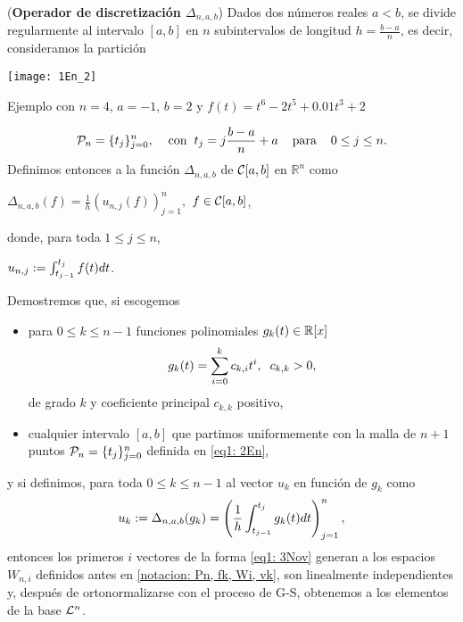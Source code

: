 \begin{defi}
(\textbf{Operador de discretización $\Delta_{n,a,b}$})
Dados dos números reales $a<b$, se divide
regularmente al intervalo $[a,b]$ en 
$n$ subintervalos de longitud $h=\frac{b-a}{n}$,
es decir, consideramos la partición


\begin{marginfigure}
\texttt{[image: 1En\_2]} 
		\caption{Ejemplo con $n=4$, $a=-1$, $b=2$ y
		$f(t)= t^{6}-2t^{5}+0.01t^{3}+2$}
\end{marginfigure}


\begin{equation}
\label{eq1: 2En}
\mathcal{P}_{n}= \{ t_{j} \}_{j=0}^{n}, 
\hspace{0.4cm} \text{con} \hspace{0.2cm}
t_{j}=j\frac{b-a}{n}+a \hspace{0.4cm} \text{para}\hspace{0.4cm}
 0 \leq j \leq n.
\end{equation}
Definimos entonces a la función $\Delta_{n,a,b}$ 
de $\mathcal{C}[a,b]$ en $\mathbb{R}^{n}$ como
\begin{center}
$\Delta_{n,a,b}(f)= \frac{1}{h} (u_{n,j}(f))_{j=1}^{n},$ \hspace{0.3cm}
$f \in \mathcal{C}[a,b]$,
\end{center}
donde, para toda $1 \leq j \leq n$,
\begin{center}
$u_{n,j}:= \int_{t_{j-1}}^{t_{j}}{f(t)dt}$.
\end{center}
\end{defi}



\noindent
Demostremos que, si escogemos
\begin{itemize}
\item para $0 \leq k \leq n-1$ funciones polinomiales
$g_{k}(t) \in \mathbb{R}[x]$
\begin{equation}
\label{eq10: 3Nov}
g_{k}(t)= \sum\limits_{i=0}^{k}c_{k,i}t^{i},
\hspace{0.2cm} c_{k, k} >0,
\end{equation}
de grado $k$ y coeficiente principal 
$c_{k,k}$ positivo, 

\item cualquier intervalo $[a,b]$ que partimos 
uniformemente con la malla de $n+1$ puntos
$\mathcal{P}_{n}= \{ t_{j} \}_{j=0}^{n}$ 
definida en \eqref{eq1: 2En},

\end{itemize}

y si definimos, para toda $0\leq k \leq  n-1$
al vector $u_{k}$ en función de $g_{k}$ como 
\begin{equation}
\label{eq1: 3Nov}
u_{k}:= \Delta_{n,a,b}(g_{k})
= \left( \frac{1}{h} 
\int_{t_{j-1}}^{t_{j}}{g_{k}(t)dt} \right)_{j=1}^{n} , 
\end{equation}
entonces los primeros $i$ vectores
de la forma \eqref{eq1: 3Nov}
generan a los espacios $W_{n,i}$
definidos antes en 
\ref{notacion: Pn, fk, Wi, vk},
son linealmente independientes y,
después de ortonormalizarse con 
el proceso de G-S,
obtenemos a los elementos de la base $\mathcal{L}^{n}$.

